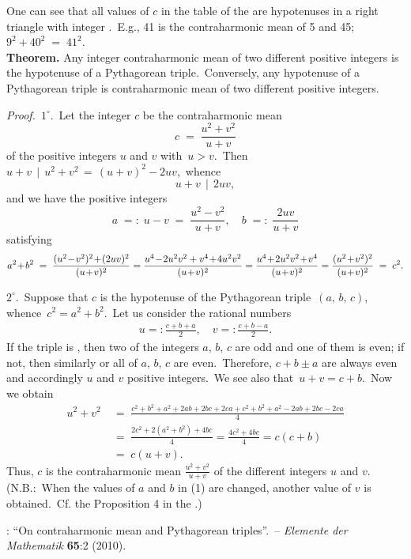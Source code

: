 \documentclass[12pt]{article}
\theoremstyle{definition}
\begin{document}
One can see that all values of $c$ in the table of the  are hypotenuses in a right triangle with integer .\, E.g., 41 is the contraharmonic mean of 5 and 45;\; $9^2\!+\!40^2 \;=\; 41^2$.\\

\textbf{Theorem.}\; Any integer contraharmonic mean of two different positive integers is the hypotenuse of a Pythagorean triple.\, Conversely, any hypotenuse of a Pythagorean triple is contraharmonic mean of two different positive integers.

{\em Proof.}\, $1^\circ.$\, Let the integer $c$ be the contraharmonic mean 
                 $$c \;=\; \frac{u^2\!+\!v^2}{u\!+\!v}$$
of the positive integers $u$ and $v$ with\, $u > v$.\, Then\; $u\!+\!v \,\mid\, u^2\!+\!v^2 \,=\, (u\!+\!v)^2-2uv$,\,
whence 
$$u\!+\!v \,\mid\, 2uv,$$
and we have the positive integers
$$a \;=:\; u\!-\!v \;=\; \frac{u^2\!-\!v^2}{u\!+\!v}, \quad b \;=:\; \frac{2uv}{u\!+\!v}$$
satisfying
$$a^2\!+\!b^2 \;=\; \frac{(u^2\!-\!v^2)^2\!+\!(2uv)^2}{(u\!+\!v)^2} 
= \frac{u^4\!-\!2u^2v^2+v^4\!+\!4u^2v^2}{(u\!+\!v)^2}  
= \frac{u^4\!+\!2u^2v^2\!+\!v^4}{(u\!+\!v)^2} = \frac{(u^2\!+\!v^2)^2}{(u\!+\!v)^2} \;=\; c^2.\\$$

$2^\circ.$\, Suppose that $c$ is the hypotenuse of the Pythagorean triple \,$(a,\,b,\,c)$,\, whence\, 
$c^2 = a^2\!+\!b^2$.\, Let us consider the rational numbers
\begin{align}
u =: \frac{c\!+\!b\!+\!a}{2}, \quad v =: \frac{c\!+\!b\!-\!a}{2}.
\end{align}
If the triple is , then two of the integers $a,\,b,\,c$ are odd and one of them is even; if not, then similarly or all of $a,\,b,\,c$ are even.\, Therefore, $c\!+\!b\!\pm\!a$ are always even and accordingly $u$ and $v$ positive integers.\, We see also that\, $u\!+\!v = c\!+\!b$.\, Now we obtain
\begin{align*}
u^2\!+\!v^2\; & =\;  \frac{c^2\!+\!b^2\!+\!a^2\!+\!2ab\!+\!2bc\!+\!2ca\!+\!c^2\!+\!b^2\!+\!a^2\!-\!2ab\!+\!2bc\!-\!2ca}{4}\\
              & =\; \frac{2c^2\!+\!2(a^2\!+\!b^2)\!+\!4bc}{4} = \frac{4c^2\!+\!4bc}{4} = c(c\!+\!b)\\
              & =\; c(u\!+\!v).
\end{align*}
Thus, $c$ is the contraharmonic mean $\displaystyle\frac{u^2\!+\!v^2}{u\!+\!v}$ of the different integers $u$ and $v$. (N.B.:\, When the values of $a$ and $b$ in (1) are changed, another value of $v$ is obtained.\, Cf. the Proposition 4 in the 
.)

\begin{thebibliography}{8}
: ``On contraharmonic mean and Pythagorean triples''.\, -- \emph{Elemente der Mathematik} \textbf{65}:2 (2010).
\end{thebibliography}



\end{document}
